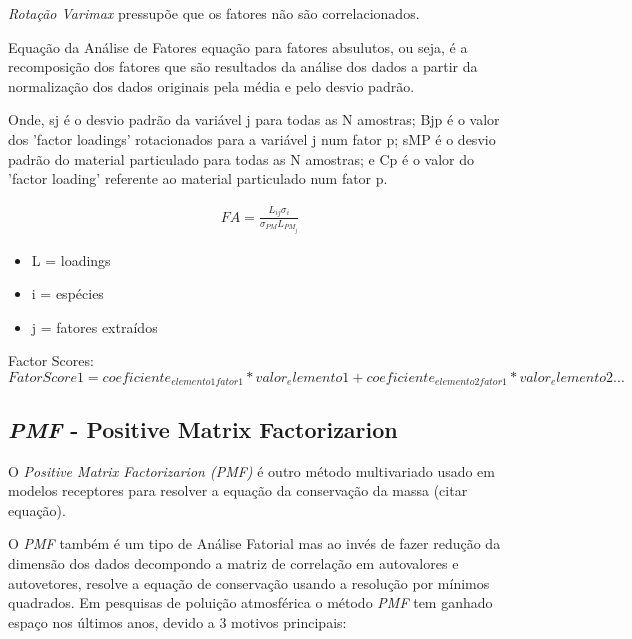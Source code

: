 \textit{Rotação Varimax} pressupõe que os fatores não são correlacionados.

Equação da Análise de Fatores
equação para fatores absulutos, ou seja, é a recomposição dos fatores que 
são resultados da análise dos dados a partir da normalização dos dados 
originais pela média e pelo desvio padrão.

\citep{keiding1986}

Onde, sj é o desvio padrão da variável j para todas as N amostras; Bjp é o valor dos 'factor loadings' rotacionados para a variável j num fator p; sMP é o desvio padrão do material particulado para todas as N amostras; e Cp é o valor do 'factor loading' referente ao material particulado num fator p.

\begin{eqnarray}
FA = \frac{L_{ij}\sigma_i}{\sigma_{PM}L_{PM_j}}
\end{eqnarray}

\begin{itemize}
  \item L = loadings
  \item i = espécies
  \item j = fatores extraídos
\end{itemize}

Factor Scores: 
\begin{equation}
FatorScore1 = coeficiente_{elemento1 fator1}*valor_elemento1 + coeficiente_{elemento2 fator1}*valor_elemento2 ...
\end{equation} 

\subsection{\textit{PMF} - Positive Matrix Factorizarion}

O \textit{Positive Matrix Factorizarion (PMF)} é outro método multivariado usado
em modelos receptores para resolver a equação da conservação da massa 
(citar equação).



O \textit{PMF} também é um tipo de Análise Fatorial
mas ao invés de fazer redução da dimensão dos dados decompondo a matriz de 
correlação em autovalores e autovetores, resolve a equação de conservação 
usando a resolução por mínimos quadrados. Em pesquisas de poluição atmosférica 
o método \textit{PMF} tem ganhado espaço nos últimos anos, devido a 3 motivos 
principais:

